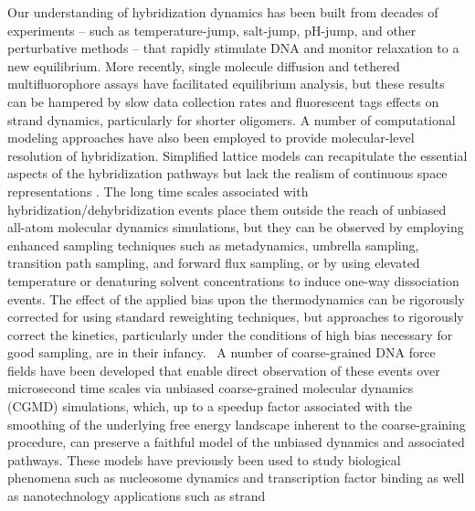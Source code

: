 \documentclass[journal=jpcbfk,manuscript=article]{achemso}
\begin{document}
Our understanding of hybridization dynamics has been built from decades of experiments -- such as temperature-jump, salt-jump, pH-jump, and other perturbative methods -- that rapidly stimulate DNA and monitor relaxation to a new equilibrium.\citep{Morrison1993SensitiveSolution, Wetmur1968KineticsDNA, Craig1971RelaxationOligonucleotides, Porschke1973ThermodynamicsPairs, Williams1989LaserDGCATGC, Narayanan2012ExploringMixing, Chen2007InfluenceHybridization, Sanstead2018DirectDehybridization} More recently, single molecule diffusion and tethered multifluorophore assays have facilitated equilibrium analysis, but these results can be hampered by slow data collection rates and fluorescent tags effects on strand dynamics, particularly for shorter oligomers.\citep{Liu20173DSolution,  Schickinger2018TetheredHelices, Chen2008Base-by-baseSpectroscopy, Dupuis2013Single-moleculeHelices} A number of computational modeling approaches have also been employed to provide molecular-level resolution of hybridization. Simplified lattice models can recapitulate the essential aspects of the hybridization pathways but lack the realism of continuous space representations \citep{Araque2016LatticeCooperativity, Phys2019}. The long time scales associated with hybridization/dehybridization events place them outside the reach of unbiased all-atom molecular dynamics simulations,\citep{Hinckley2014Coarse-grainedEffects} but they can be observed by employing enhanced sampling techniques such as metadynamics, umbrella sampling,  transition path sampling, and forward flux sampling,\citep{Piana2007AtomisticTransition, Zerze2021ThermodynamicsSimulations, Hinckley2013AnHybridization, Schmitt2013ExploringSurface, Sambriski2009, Sambriski2009SequencePathways, Hoefert2011MolecularOligonucleotides,Romano2013DNADependence, Hinckley2014Coarse-grainedEffects} or by using elevated temperature or denaturing solvent concentrations to induce one-way dissociation events.\citep{Wong2008TheSimulations, Perez2010Real-timeUnfolding} The effect of the applied bias upon the thermodynamics can be rigorously corrected for using standard reweighting techniques, but approaches to rigorously correct the kinetics, particularly under the conditions of high bias necessary for good sampling, are in their infancy.~\citep{Prinz2011OptimalDynamics, Chodera2011DynamicalTemperatures, Stelzl2017DynamicSimulations, Donati2017GirsanovModels, Donati2018GirsanovSimulations, Quer2018ANCOORDINATES} A number of coarse-grained DNA force fields have been developed that enable direct observation of these events over microsecond time scales via unbiased coarse-grained molecular dynamics (CGMD) simulations, \citep{Romano2013DNADependence, Hinckley2013AnHybridization, Maciejczyk2014DNAModel, Markegard2015, Dans2016MultiscaleDNA} which, up to a speedup factor associated with the smoothing of the underlying free energy landscape inherent to the coarse-graining procedure, can preserve a faithful model of the unbiased dynamics and associated pathways. These models have previously been used to study biological phenomena such as nucleosome dynamics\citep{Lequieu2016Tension-dependentUnwrapping, Lequieu2017InSliding} and transcription factor binding \cite{Terakawa2015P53Simulations, Tan2018DynamicData} as well as nanotechnology applications such as strand 
\end{document}
